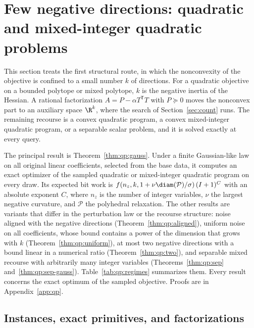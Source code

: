 \section{Few negative directions: quadratic and mixed-integer quadratic problems}\label{sec:qp}

This section treats the first structural route, in which the nonconvexity of
the objective is confined to a small number $k$ of directions. For a
quadratic objective on a bounded polytope or mixed polytope, $k$ is the
negative inertia of the Hessian. A rational factorization
$A=P-\alpha T^{\mathsf T} T$ with $P\succeq0$ moves the nonconvex part to an
auxiliary space $\R^k$, where the search of Section~\ref{sec:count} runs. The
remaining recourse is a convex quadratic program, a convex mixed-integer
quadratic program, or a separable scalar problem, and it is solved exactly at
every query.

The principal result is Theorem~\ref{thm:qp:gauss}. Under a finite
Gaussian-like law on all original linear coefficients, selected from the
base data, it computes an exact optimizer of the sampled quadratic or
mixed-integer quadratic program on every draw. Its expected bit work is
$f(n_z,k,1+\nu\diam(\mathcal P)/\sigma)\,(I+1)^{C}$ with an absolute
exponent $C$, where $n_z$ is the number of integer variables, $\nu$ the
largest negative curvature, and $\mathcal P$ the polyhedral relaxation. The
other results are variants that differ in the perturbation law or the
recourse structure: noise aligned with the negative directions
(Theorem~\ref{thm:qp:aligned}), uniform noise on all coefficients, whose
bound contains a power of the dimension that grows with $k$
(Theorem~\ref{thm:qp:uniform}), at most two negative directions with a bound
linear in a numerical ratio (Theorem~\ref{thm:qp:two}), and separable mixed
recourse with arbitrarily many integer variables
(Theorems~\ref{thm:qp:sep} and~\ref{thm:qp:sep-gauss}).
Table~\ref{tab:qp:regimes} summarizes them. Every result concerns the exact
optimum of the sampled objective. Proofs are in Appendix~\ref{app:qp}.

\subsection{Instances, exact primitives, and factorizations}\label{sec:qp:model}

